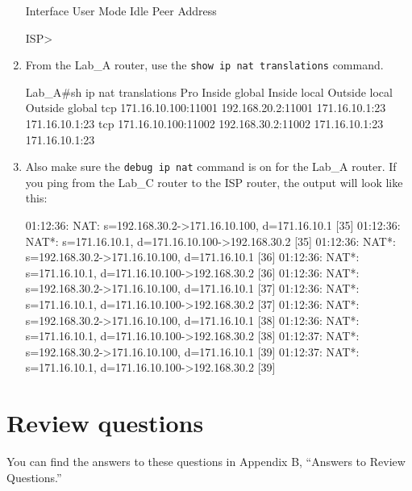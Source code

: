 \begin{enumerate}
\begin{cli}
  Interface  User      Mode               Idle Peer Address
 
ISP>
\end{cli}
\item
  From the Lab\_A router, use the \texttt{show\ ip\ nat\ translations}
  command.

\begin{cli}
Lab_A#sh ip nat translations
Pro Inside global  Inside local  Outside local Outside global
tcp 171.16.10.100:11001 192.168.20.2:11001 171.16.10.1:23    
171.16.10.1:23
tcp 171.16.10.100:11002 192.168.30.2:11002 171.16.10.1:23    
171.16.10.1:23
\end{cli}
\item
  Also make sure the \texttt{debug\ ip\ nat} command is on for the
  Lab\_A router. If you ping from the Lab\_C router to the ISP router,
  the output will look like this:

\begin{cli}
01:12:36: NAT: s=192.168.30.2->171.16.10.100, d=171.16.10.1 [35]
01:12:36: NAT*: s=171.16.10.1, d=171.16.10.100->192.168.30.2 [35]
01:12:36: NAT*: s=192.168.30.2->171.16.10.100, d=171.16.10.1 [36]
01:12:36: NAT*: s=171.16.10.1, d=171.16.10.100->192.168.30.2 [36]
01:12:36: NAT*: s=192.168.30.2->171.16.10.100, d=171.16.10.1 [37]
01:12:36: NAT*: s=171.16.10.1, d=171.16.10.100->192.168.30.2 [37]
01:12:36: NAT*: s=192.168.30.2->171.16.10.100, d=171.16.10.1 [38]
01:12:36: NAT*: s=171.16.10.1, d=171.16.10.100->192.168.30.2 [38]
01:12:37: NAT*: s=192.168.30.2->171.16.10.100, d=171.16.10.1 [39]
01:12:37: NAT*: s=171.16.10.1, d=171.16.10.100->192.168.30.2 [39]
\end{cli}
\end{enumerate}



\section{Review questions}

You can find the answers to these questions in Appendix B, ``Answers to
Review Questions.''

